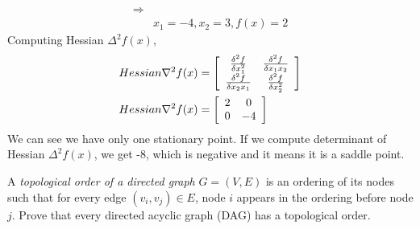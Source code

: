 \documentclass[a4paper,10pt]{article}
\begin{document}
\begin{enumerate}
\begin{equation}
\begin{split}
               \Rightarrow & \\
               & x_1 = -4, x_2 = 3, f(x) = 2
        \end{split}
    \end{equation}
    Computing Hessian $\Delta^2 f(x)$,
    \begin{equation}
        \begin{split}
          Hessian \nabla^2f(x) & = \left[\begin{array}{c c} \frac{\delta^2f}{\delta x_1^2} &\frac{\delta^2f}{\delta x_1x_2}  \\  \frac{\delta^2f}{\delta x_2x_1}  &\frac{\delta^2f}{\delta x_2^2} \end{array} \right] \\
          Hessian \nabla^2f(x) & = \left[\begin{array}{c c} 2  &0  \\ 0  &-4 \end{array} \right]
        \end{split}
    \end{equation}
    We can see we have only one stationary point. If we compute determinant of Hessian $\Delta^2 f(x)$, we get -8, which is negative and it means it is a saddle point.
    \\
    \begin{taskbox}
    A \emph{topological order of a directed graph} $G=(V, E)$ is an ordering of its nodes such that for every edge $(v_i, v_j) \in E$, node $i$ appears in the ordering before node $j$. Prove that every directed acyclic graph (DAG) has a topological order. \\[5pt]
    

\end{taskbox}
\end{enumerate}
\end{document}
